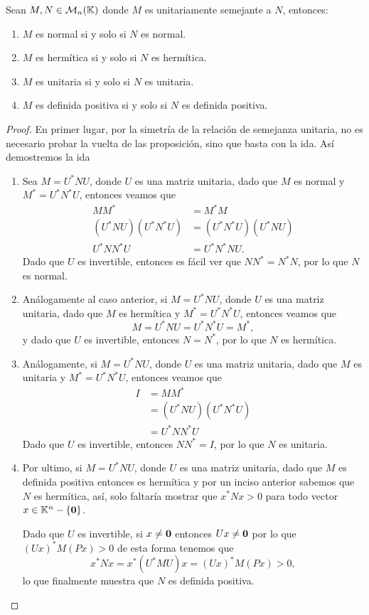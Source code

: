\begin{teor}
  Sean $M,N \in \mathcal{M}_n(\mathbb{K})$ donde $M$ es unitariamente semejante a $N$, entonces:
  \begin{enumerate}
    \item $M$ es normal si y solo si $N$ es normal.
    \item $M$ es hermítica si y solo si $N$ es hermítica.
    \item $M$ es unitaria si y solo si $N$ es unitaria.
    \item $M$ es definida positiva si y solo si $N$ es definida positiva.
  \end{enumerate}
\end{teor}
\begin{proof}
  En primer lugar, por la simetría de la relación de semejanza unitaria, no es necesario probar la vuelta de las proposición, sino que basta con la ida. Así demostremos la ida
  \begin{enumerate}
    \item Sea $M = U^* N U$, donde $U$ es una matriz unitaria, dado que $M$ es normal y $M^* = U^* N^* U$, entonces veamos que
      \begin{align*}
        MM^* &= M^* M \\
        (U^* N U)(U^* N^* U) &= (U^* N^* U)(U^* N U) \\
        U^* N N^* U &= U^* N^* N U.
      \end{align*}
    Dado que $U$ es invertible, entonces es fácil ver que $NN^* = N^* N$, por lo que $N$ es normal.

    \item Análogamente al caso anterior, si $M = U^* N U$, donde $U$ es una matriz unitaria, dado que $M$ es hermítica y $M^* = U^* N^* U$, entonces veamos que
      \[ M =  U^* N U = U^* N^* U = M^*, \]
    y dado que $U$ es invertible, entonces $N = N^*$, por lo que $N$ es hermítica.

    \item Análogamente, si $M = U^* N U$, donde $U$ es una matriz unitaria, dado que $M$ es unitaria y $M^* = U^* N^* U$, entonces veamos que
    \begin{align*}
      I &= MM^*  \\
      &= (U^* N U)(U^* N^* U)  \\
      &= U^* N N^* U 
    \end{align*}
  Dado que $U$ es invertible, entonces $NN^* = I$, por lo que $N$ es unitaria.

  \item Por ultimo, si $M = U^* N U$, donde $U$ es una matriz unitaria, dado que $M$ es definida positiva entonces es hermítica y por un inciso anterior sabemos que $N$ es hermítica, así, solo faltaría mostrar que $x^* N x > 0$ para todo vector $x \in \mathbb{K}^n - \{\mathbf{0}\}$.
  
  Dado que $U$ es invertible, si $x \neq \mathbf{0}$ entonces $Ux \neq \mathbf{0}$ por lo que $(Ux)^* M (Px)>0$ de esta forma tenemos que
    \[x^* N x = x^* (U^* M U) x = (Ux)^* M (Px) > 0,\]
  lo que finalmente muestra que $N$ es definida positiva. \qedhere
  \end{enumerate}
\end{proof}


